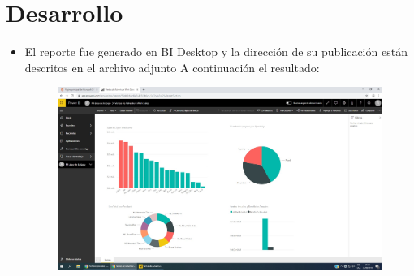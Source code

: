 \section{Desarrollo} 
\begin{itemize}

	\item El reporte fue generado en BI Desktop y la dirección de su publicación están descritos en el archivo adjunto
A continuación el resultado: 
		\begin{figure}[H]
		\begin{center}
		\includegraphics[width=15cm]{./Imagenes/1}
		\end{center}
		\end{figure}




\end{itemize}
		